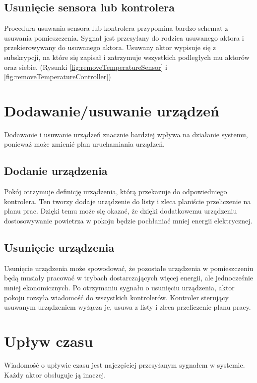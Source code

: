 


\subsection*{Usunięcie sensora lub kontrolera}
Procedura usuwania sensora lub kontrolera przypomina bardzo schemat z usuwania pomieszczenia. Sygnał jest przesyłany do rodzica usuwanego aktora i przekierowywany do usuwanego aktora. Usuwany aktor wypisuje się z subskrypcji, na które się zapisał i zatrzymuje wszystkich podległych mu aktorów oraz siebie. (Rysunki \ref{fig:removeTemperatureSensor} i \ref{fig:removeTemperatureController})



\section{Dodawanie/usuwanie urządzeń}
Dodawanie i usuwanie urządzeń znacznie bardziej wpływa na działanie systemu, ponieważ może zmienić plan uruchamiania urządzeń. 

\subsection*{Dodanie urządzenia}
Pokój otrzymuje definicję urządzenia, którą przekazuje do odpowiedniego kontrolera. Ten tworzy dodaje urządzenie do listy i zleca planiście przeliczenie na planu prac. Dzięki temu może się okazać, że dzięki dodatkowemu urządzeniu dostosowywanie powietrza w pokoju będzie pochłaniać mniej energii elektrycznej. 


\subsection*{Usunięcie urządzenia}
Usunięcie urządzenia może spowodować, że pozostałe urządzenia w pomieszczeniu będą musiały pracować w trybach dostarczających więcej energii, ale jednocześnie mniej ekonomicznych. 
Po otrzymaniu sygnału o usunięciu urządzenia, aktor pokoju rozsyła wiadomość do wszystkich kontrolerów. Kontroler sterujący usuwanym urządzeniem wyłącza je, usuwa z listy i zleca przeliczenie planu pracy. 


\section{Upływ czasu}
Wiadomość o upływie czasu jest najczęściej przesyłanym sygnałem w systemie. Każdy aktor obsługuje ją inaczej. 

